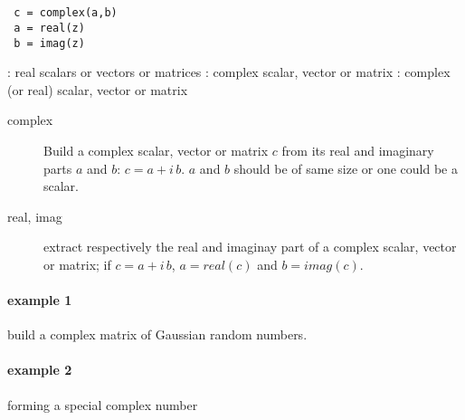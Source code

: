 
\begin{mandesc}
   \\
   \\
\end{mandesc}

\begin{calling_sequence}
\begin{verbatim}
 c = complex(a,b)
 a = real(z)
 b = imag(z)
\end{verbatim}
\end{calling_sequence}

\begin{parameters}
  \begin{varlist}
   : real scalars or vectors or matrices
   : complex scalar, vector or matrix
   : complex (or real) scalar, vector or matrix
  \end{varlist}
\end{parameters}

\begin{mandescription}
\begin{description}
\item[complex]  Build a complex scalar, vector or matrix $c$ from its real and imaginary parts
  $a$ and $b$: $c = a + i \, b$.
 $a$ and $b$ should be of same size or one could be a scalar.
\item[real, imag] extract respectively the real and imaginay part of a complex scalar, 
 vector or matrix; if $c = a + i \, b$, $ a = real(c)$ and $ b = imag(c)$. 
\end{description}
\end{mandescription}

\begin{examples}
\paragraph{example 1} build a complex matrix of Gaussian random numbers.
\begin{program}
\end{program}

\paragraph{example 2} forming a special complex number
\begin{program}
\end{program}


\end{examples}


\begin{manseealso}
\end{manseealso}
